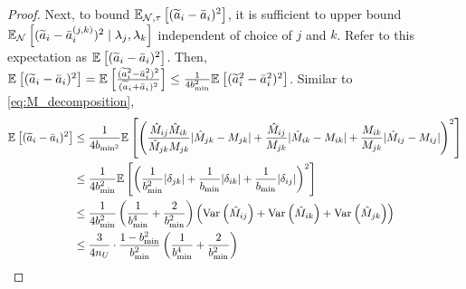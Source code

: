 \begin{proof}
Next, to bound $\mathbb{E}_{\mathcal{N}, \tau}\left[(\widetilde{a}_i - \bar{a}_i)^2\right]$, it is sufficient to upper bound $\mathbb{E}_{\mathcal{N}}\left[(\widetilde{a}_i - \bar{a}_i^{(j, k)})^2 \; | \; \lambda_j, \lambda_k\right]$ independent of choice of $j$ and $k$. Refer to this expectation as $\mathbb{E}_{}\left[(\widetilde{a}_i - \bar{a}_i)^2\right]$. Then, $\mathbb{E}_{}\left[(\widetilde{a}_i - \bar{a}_i)^2 \right] = \mathbb{E}_{}\left[\frac{(\widetilde{a}_i^2 - \bar{a}_i^2)^2}{(\widetilde{a}_i + \bar{a}_i)^2}\right] \le \frac{1}{4b_{\min}^2} \mathbb{E}_{}\left[(\widetilde{a}_i^2 - \bar{a}_i^2)^2\right]$. Similar to \eqref{eq:M_decomposition},
\begin{align}
    \mathbb{E}_{}\left[(\widetilde{a}_i - \bar{a}_i)^2 \right] &\le \frac{1}{4b_{\min^2}} \mathbb{E}_{}\left[\left(\frac{\hat{M}_{ij} \hat{M}_{ik}}{\hat{M}_{jk} M_{jk}} |\hat{M}_{jk} - M_{jk}| + \frac{\hat{M}_{ij}}{M_{jk}}|\hat{M}_{ik} - M_{ik}| + \frac{M_{ik}}{M_{jk}} |\hat{M}_{ij} - M_{ij} |  \right)^2\right] \\
    &\le \frac{1}{4b_{\min}^2} \mathbb{E}_{}\left[\left(\frac{1}{b_{\min}^2} |\delta_{jk}| + \frac{1}{b_{\min}} |\delta_{ik} | + \frac{1}{b_{\min}}|\delta_{ij} | \right)^2\right] \\
    &\le \frac{1}{4b_{\min}^2} \left(\frac{1}{b_{\min}^4} + \frac{2}{b_{\min}^2}\right) \left(\mathrm{Var}_{}\left(\hat{M}_{ij}\right) + \mathrm{Var}_{}\left(\hat{M}_{ik}\right) + \mathrm{Var}_{}\left(\hat{M}_{jk}\right)\right) \\
    &\le \frac{3}{4 n_U} \cdot \frac{1 - b_{\min}^2}{b_{\min}^2} \left(\frac{1}{b_{\min}^4} + \frac{2}{b_{\min}^2} \right)
\end{align}


\end{proof}

